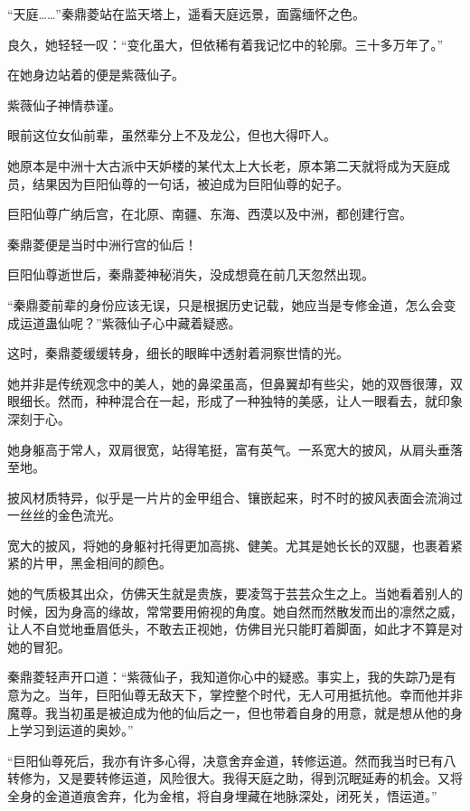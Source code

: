 
\begin{this_body}



“天庭……”秦鼎菱站在监天塔上，遥看天庭远景，面露缅怀之色。

良久，她轻轻一叹：“变化虽大，但依稀有着我记忆中的轮廓。三十多万年了。”

在她身边站着的便是紫薇仙子。

紫薇仙子神情恭谨。

眼前这位女仙前辈，虽然辈分上不及龙公，但也大得吓人。

她原本是中洲十大古派中天妒楼的某代太上大长老，原本第二天就将成为天庭成员，结果因为巨阳仙尊的一句话，被迫成为巨阳仙尊的妃子。

巨阳仙尊广纳后宫，在北原、南疆、东海、西漠以及中洲，都创建行宫。

秦鼎菱便是当时中洲行宫的仙后！

巨阳仙尊逝世后，秦鼎菱神秘消失，没成想竟在前几天忽然出现。

“秦鼎菱前辈的身份应该无误，只是根据历史记载，她应当是专修金道，怎么会变成运道蛊仙呢？”紫薇仙子心中藏着疑惑。

这时，秦鼎菱缓缓转身，细长的眼眸中透射着洞察世情的光。

她并非是传统观念中的美人，她的鼻梁虽高，但鼻翼却有些尖，她的双唇很薄，双眼细长。然而，种种混合在一起，形成了一种独特的美感，让人一眼看去，就印象深刻于心。

她身躯高于常人，双肩很宽，站得笔挺，富有英气。一系宽大的披风，从肩头垂落至地。

披风材质特异，似乎是一片片的金甲组合、镶嵌起来，时不时的披风表面会流淌过一丝丝的金色流光。

宽大的披风，将她的身躯衬托得更加高挑、健美。尤其是她长长的双腿，也裹着紧紧的片甲，黑金相间的颜色。

她的气质极其出众，仿佛天生就是贵族，要凌驾于芸芸众生之上。当她看着别人的时候，因为身高的缘故，常常要用俯视的角度。她自然而然散发而出的凛然之威，让人不自觉地垂眉低头，不敢去正视她，仿佛目光只能盯着脚面，如此才不算是对她的冒犯。

秦鼎菱轻声开口道：“紫薇仙子，我知道你心中的疑惑。事实上，我的失踪乃是有意为之。当年，巨阳仙尊无敌天下，掌控整个时代，无人可用抵抗他。幸而他并非魔尊。我当初虽是被迫成为他的仙后之一，但也带着自身的用意，就是想从他的身上学习到运道的奥妙。”

“巨阳仙尊死后，我亦有许多心得，决意舍弃金道，转修运道。然而我当时已有八转修为，又是要转修运道，风险很大。我得天庭之助，得到沉眠延寿的机会。又将全身的金道道痕舍弃，化为金棺，将自身埋藏在地脉深处，闭死关，悟运道。”


\end{this_body}
